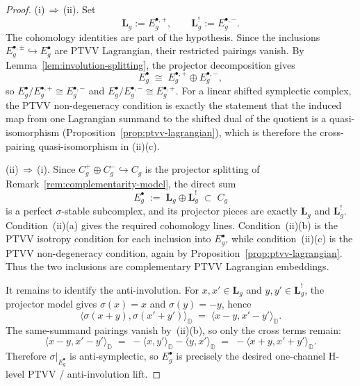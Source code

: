 \begin{proof}
\textup{(i)}\,$\Rightarrow$\,\textup{(ii)}.
Set
\[
\mathbf{L}_g := E_g^{\bullet,+},
\qquad
\mathbf{L}_g^! := E_g^{\bullet,-}.
\]
The cohomology identities are part of the hypothesis.  Since the
inclusions
$E_g^{\bullet,\pm} \hookrightarrow E_g^\bullet$
are PTVV Lagrangian, their restricted pairings vanish.  By
Lemma~\ref{lem:involution-splitting}, the projector decomposition gives
\[
E_g^\bullet \;\cong\; E_g^{\bullet,+} \oplus E_g^{\bullet,-},
\]
so
$E_g^\bullet / E_g^{\bullet,+} \cong E_g^{\bullet,-}$ and
$E_g^\bullet / E_g^{\bullet,-} \cong E_g^{\bullet,+}$.
For a linear shifted symplectic complex, the PTVV non-degeneracy
condition is exactly the statement that the induced map from one
Lagrangian summand to the shifted dual of the quotient is a
quasi-isomorphism
\textup{(}Proposition~\textup{\ref{prop:ptvv-lagrangian}}\textup{)},
which is therefore the cross-pairing quasi-isomorphism in
\textup{(ii)(c)}.

\textup{(ii)}\,$\Rightarrow$\,\textup{(i)}.
Since
$C_g^+ \oplus C_g^- \hookrightarrow C_g$
is the projector splitting of
Remark~\ref{rem:complementarity-model}, the direct sum
\[
E_g^\bullet \;:=\; \mathbf{L}_g \oplus \mathbf{L}_g^!
\;\subset\; C_g
\]
is a perfect $\sigma$-stable subcomplex, and its projector pieces are
exactly $\mathbf{L}_g$ and $\mathbf{L}_g^!$.
Condition~\textup{(ii)(a)} gives the required cohomology lines.
Condition~\textup{(ii)(b)} is the PTVV isotropy condition for each
inclusion into $E_g^\bullet$, while condition~\textup{(ii)(c)} is the
PTVV non-degeneracy condition, again by
Proposition~\ref{prop:ptvv-lagrangian}.
Thus the two inclusions are complementary PTVV Lagrangian embeddings.

It remains to identify the anti-involution.  For
$x,x' \in \mathbf{L}_g$ and $y,y' \in \mathbf{L}_g^!$, the projector
model gives $\sigma(x)=x$ and $\sigma(y)=-y$, hence
\[
\bigl\langle \sigma(x+y), \sigma(x'+y') \bigr\rangle_{\mathbb{D}}
\;=\;
\bigl\langle x-y, x'-y' \bigr\rangle_{\mathbb{D}}.
\]
The same-summand pairings vanish by~\textup{(ii)(b)}, so only the cross
terms remain:
\[
\bigl\langle x-y, x'-y' \bigr\rangle_{\mathbb{D}}
\;=\;
-\langle x,y' \rangle_{\mathbb{D}}
-\langle y,x' \rangle_{\mathbb{D}}
\;=\;
-\bigl\langle x+y, x'+y' \bigr\rangle_{\mathbb{D}}.
\]
Therefore $\sigma|_{E_g^\bullet}$ is anti-symplectic, so
$E_g^\bullet$ is precisely the desired one-channel H-level PTVV /
anti-involution lift.
\end{proof}

